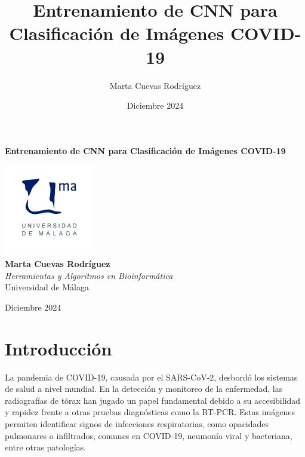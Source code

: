 \documentclass{article}
\begin{document}
\title{Entrenamiento de CNN para Clasificación de Imágenes COVID-19}
\author{Marta Cuevas Rodríguez}
\date{Diciembre 2024}


	
	\begin{titlepage}
		\centering
		\vspace*{3cm}
		
		{\Huge \textbf{Entrenamiento de CNN para Clasificación de Imágenes COVID-19}\\[0.5cm]}
		
		\vspace{2cm}
		\includegraphics[width=0.3\textwidth]{images/uma_logo.jpg}\\[1cm]
		
		{\LARGE \textbf{Marta Cuevas Rodríguez}\\[0.5cm]}
		{\large \textit{Herramientas y Algoritmos en Bioinformática}\\
			Universidad de Málaga\\
		}
		
		\vfill
		
		{\large Diciembre 2024}
	\end{titlepage}
	
	\tableofcontents
	\newpage
	
	\section{Introducción}
	
	La pandemia de COVID-19, causada por el SARS-CoV-2, desbordó los sistemas de salud a nivel mundial. En la detección y monitoreo de la enfermedad, las radiografías de tórax han jugado un papel fundamental debido a su accesibilidad y rapidez frente a otras pruebas diagnósticas como la RT-PCR. Estas imágenes permiten identificar signos de infecciones respiratorias, como opacidades pulmonares o infiltrados, comunes en COVID-19, neumonía viral y bacteriana, entre otras patologías.
	\\
	
\end{document}
